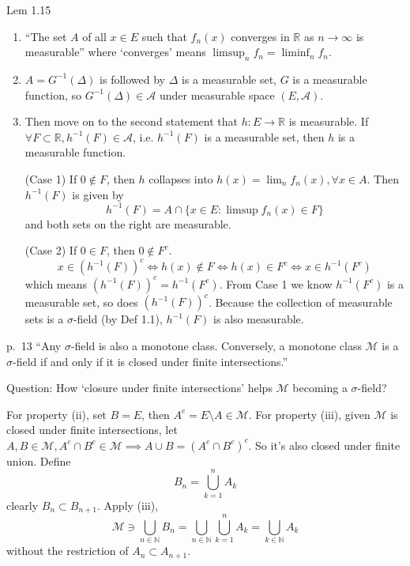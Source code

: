 \begin{note}{Lem 1.15}
\begin{enumerate}
    \item ``The set $A$ of all $x\in E$ such that $f_n(x)$ converges in $\mathbb{R}$ as $n\to\infty$ is measurable'' where `converges' means $\limsup_n f_n=\liminf_nf_n$. 

    \item $A=G^{-1}(\Delta)$ is followed by $\Delta$ is a measurable set, $G$ is a measurable function, so $G^{-1}(\Delta)\in\mathcal{A}$ under measurable space $(E,\mathcal{A})$.

    \item Then move on to the second statement that $h:E\to\mathbb{R}$ is measurable. If $\forall F\subset \mathbb{R}, h^{-1}(F)\in \mathcal{A}$, i.e. $h^{-1}(F)$ is a measurable set, then $h$ is a measurable function. 
    
    (Case 1) If $0\notin F$, then $h$ collapses into $h(x)=\lim_n f_n(x),\forall x\in A$. Then $h^{-1}(F)$ is given by
    \[
    h^{-1}(F)=A\cap \{x\in E:\limsup f_n(x)\in F\}
    \]
    and both sets on the right are measurable.
    
    (Case 2) If $0\in F$, then $0\notin F^c$.
    \[
    x \in (h^{-1}(F))^c \iff h(x) \notin F \iff h(x) \in F^c \iff x \in h^{-1}(F^c)
    \]
    which means $(h^{-1}(F))^c=h^{-1}(F^c)$. From Case 1 we know $h^{-1}(F^c)$ is a measurable set, so does $(h^{-1}(F))^c$. Because the collection of measurable sets is a $\sigma$-field (by Def 1.1), $h^{-1}(F)$ is also measurable.
\end{enumerate}
\end{note}

\begin{note}{p.~13}
    ``Any $\sigma$-field is also a monotone class. Conversely, a monotone class $\mathcal{M}$ is a $\sigma$-field if and only if it is closed under finite intersections.''

    Question: How `closure under finite intersections' helps $\mathcal{M}$ becoming a $\sigma$-field?

    For property (ii), set $B=E$, then $A^c=E\setminus A\in \mathcal{M}$. For property (iii), given $\mathcal{M}$ is closed under finite intersections, let $A,B\in \mathcal{M}, A^c\cap B^c\in\mathcal{M}\implies A\cup B=(A^c\cap B^c)^c$. So it's also closed under finite union. Define
    \[
    B_n=\bigcup_{k=1}^n A_k
    \]
    clearly $B_n\subset B_{n+1}$. Apply (iii), 
    \[
    \mathcal{M}\ni\bigcup_{n\in\mathbb{N}}B_n=\bigcup_{n\in\mathbb{N}}\bigcup_{k=1}^n A_k=\bigcup_{k\in\mathbb{N}} A_k
    \]
    without the restriction of $A_n\subset A_{n+1}$.
\end{note}

